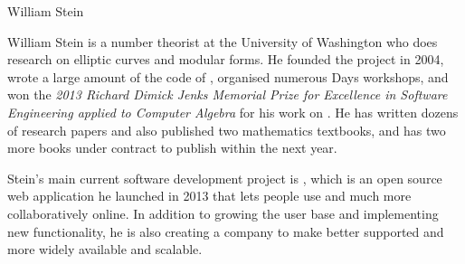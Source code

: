 \begin{participant}[type=R,PM=0,gender=male]{William Stein}

William Stein is a number theorist at the University of Washington
who does research on elliptic curves and modular forms.
He founded the \Sage project in 2004, wrote a large
amount of the code of \Sage, organised numerous \Sage Days workshops,
and won the {\em 2013 Richard Dimick Jenks
Memorial Prize for Excellence in
Software Engineering applied to Computer Algebra} for his work on \Sage.
He has written dozens of research papers and
also published two mathematics textbooks, and has two more books
under contract to publish within the next year.

Stein's main current software development project is \SMC,
which is an open source web application he launched in 2013
that lets people use \Sage and much more collaboratively online.
In addition to growing the user base and implementing
new functionality, he is also creating a company to make
\SMC better supported and
more widely available and scalable.

\end{participant}

